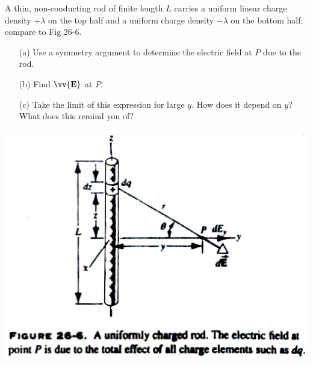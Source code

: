 \documentclass[11pt,letterpaper,boxed]{hmcpset}
\begin{document}
	\begin{problem}[HRK P26.7]
		A thin, non-conducting rod of finite length $L$ carries a uniform linear charge density $+\lambda$ on the top half and a uniform charge density $-\lambda$ on the bottom half; compare to Fig 26-6.
		
		\begin{enumerate}
			\item [(a)] Use a symmetry argument to determine the electric field at $P$ due to the rod.
			\item [(b)] Find $\vv{\textbf{E}}$ at $P$.
			\item [(c)] Take the limit of this expression for large $y$. How does it depend on $y$? What does this remind you of?
		\end{enumerate}
		
		\begin{center}
			\includegraphics[scale=0.5]{26-6.png}
		\end{center}
		
	\end{problem}
	
	\begin{solution}
		\vfill
	\end{solution}
	
\end{document}
